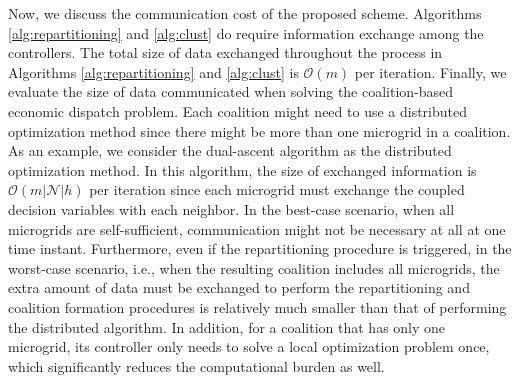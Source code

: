 Now, we discuss the communication cost of the proposed scheme. Algorithms \ref{alg:repartitioning} and \ref{alg:clust} do require information exchange among the controllers. The total size of data exchanged throughout the process in Algorithms \ref{alg:repartitioning} and \ref{alg:clust} is $\mathcal{O}(m)$ per iteration. %
Finally, we evaluate the size of data communicated when solving the coalition-based economic dispatch problem. Each coalition might need to use a distributed optimization method since there might be more than one microgrid in a coalition. As an example, we consider the dual-ascent algorithm \cite{ananduta2018} as the distributed optimization method. In this algorithm, the size of exchanged information is  $\mathcal{O}(m|\mathcal{N}|h)$ per iteration since each microgrid must exchange the coupled decision variables with each neighbor. 
In the best-case scenario, when all microgrids are self-sufficient, communication might not be necessary at all at one time instant. Furthermore, even if the repartitioning procedure is triggered, in the worst-case scenario, i.e., when the resulting coalition includes all microgrids, the extra amount of data must be exchanged to perform the repartitioning and coalition formation procedures is relatively much smaller than that of performing the distributed algorithm. In addition, for a coalition that has only one microgrid, its controller only needs to solve a local optimization problem once, which significantly reduces the computational burden as well.  
\color{black}

